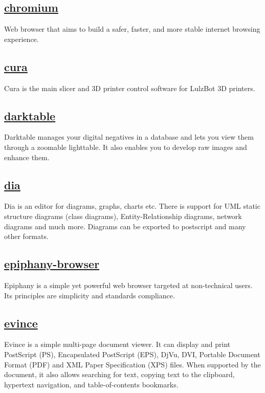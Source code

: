 \subsection{\href{http://www.chromium.org/Home}{chromium}}

 Web browser that aims to build a safer, faster, and more stable internet
 browsing experience.
 
\subsection{\href{http://github.com/alephobjects/Cura}{cura}}

Cura is the main slicer and 3D printer control software for LulzBot 3D
printers.

\subsection{\href{http://www.darktable.org/}{darktable}}

 Darktable manages your digital negatives in a database and lets you view
 them  through a zoomable lighttable. It also enables you to develop raw
 images and enhance them.
 
\subsection{\href{http://live.gnome.org/Dia}{dia}}

 Dia is an editor for diagrams, graphs, charts etc. There is support for UML
 static structure diagrams (class diagrams), Entity-Relationship diagrams,
 network diagrams and much more. Diagrams can be exported to postscript and
 many other formats.

\subsection{\href{https://wiki.gnome.org/Apps/Web}{epiphany-browser}}

 Epiphany is a simple yet powerful web browser targeted at
 non-technical users. Its principles are simplicity and standards
 compliance.
 
\subsection{\href{https://wiki.gnome.org/Apps/Evince}{evince}}

 Evince is a simple multi-page document viewer.  It can display and print
 PostScript (PS), Encapsulated PostScript (EPS), DjVu, DVI, Portable
 Document Format (PDF) and XML Paper Specification (XPS) files.
 When supported by the document, it also allows searching for text,
 copying text to the clipboard, hypertext navigation, and
 table-of-contents bookmarks.


